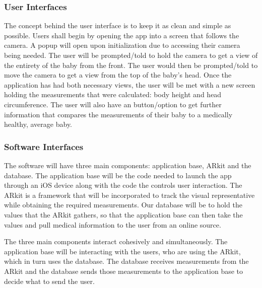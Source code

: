 \documentclass[letterpaper,10pt,draftclsnofoot,onecolumn,compsoc]{IEEEtran}
\begin{document}
\subsubsection{User Interfaces}
\begin{singlespace}
\noindent
The concept behind the user interface is to keep it as clean and simple as possible. Users shall begin by opening the app into a screen that follows the camera. A popup will open upon initialization due to accessing their camera being needed. The user will be prompted/told to hold the camera to get a view of the entirety of the baby from the front. The user would then be prompted/told to move the camera to get a view from the top of the baby's head. Once the application has had both necessary views, the user will be met with a new screen holding the measurements that were calculated: body height and head circumference. The user will also have an button/option to get further information that compares the measurements of their baby to a medically healthy, average baby.\\
\end{singlespace}

\subsubsection{Software Interfaces}
\begin{singlespace}
\noindent
The software will have three main components: application base, ARkit and the database. The application base will be the code needed to launch the app through an iOS device along with the code the controls user interaction. The ARkit is a framework that will be incorporated to track the visual representative while obtaining the required measurements. Our database will be to hold the values that the ARkit gathers, so that the application base can then take the values and pull medical information to the user from an online source.\\ \par

The three main components interact cohesively and simultaneously. The application base will be interacting with the users, who are using the ARkit, which in turn uses the database. The database receives measurements from the ARkit and the database sends those measurements to the application base to decide what to send the user.
\end{singlespace}
\end{document}
